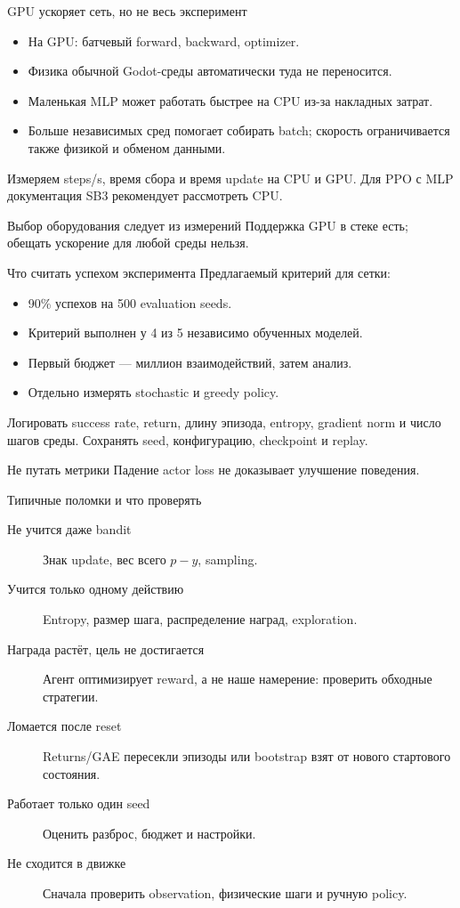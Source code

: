 \documentclass[aspectratio=169]{beamer}
\begin{document}
\begin{frame}{GPU ускоряет сеть, но не весь эксперимент}
  \begin{itemize}
    \item На GPU: батчевый forward, backward, optimizer.
    \item Физика обычной Godot-среды автоматически туда не переносится.
    \item Маленькая MLP может работать быстрее на CPU из-за накладных затрат.
    \item Больше независимых сред помогает собирать batch;
      скорость ограничивается также физикой и обменом данными.
  \end{itemize}
  Измеряем steps/s, время сбора и время update на CPU и GPU.
  Для PPO с MLP документация SB3 рекомендует рассмотреть CPU.
  \begin{block}{Выбор оборудования следует из измерений}
    Поддержка GPU в стеке есть; обещать ускорение для любой среды нельзя.
  \end{block}
\end{frame}

\begin{frame}{Что считать успехом эксперимента}
  Предлагаемый критерий для сетки:
  \begin{itemize}
    \item 90\% успехов на 500 evaluation seeds.
    \item Критерий выполнен у 4 из 5 независимо обученных моделей.
    \item Первый бюджет --- миллион взаимодействий, затем анализ.
    \item Отдельно измерять stochastic и greedy policy.
  \end{itemize}
  Логировать success rate, return, длину эпизода, entropy,
  gradient norm и число шагов среды.
  Сохранять seed, конфигурацию, checkpoint и replay.
  \begin{block}{Не путать метрики}
    Падение actor loss не доказывает улучшение поведения.
  \end{block}
\end{frame}

\begin{frame}{Типичные поломки и что проверять}
  \small
  \begin{description}
    \item[Не учится даже bandit] Знак update, вес всего $p-y$, sampling.
    \item[Учится только одному действию] Entropy, размер шага,
      распределение наград, exploration.
    \item[Награда растёт, цель не достигается] Агент оптимизирует
      reward, а не наше намерение: проверить обходные стратегии.
    \item[Ломается после reset] Returns/GAE пересекли эпизоды
      или bootstrap взят от нового стартового состояния.
    \item[Работает только один seed] Оценить разброс, бюджет и настройки.
    \item[Не сходится в движке] Сначала проверить observation,
      физические шаги и ручную policy.
  \end{description}
\end{frame}
\end{document}
